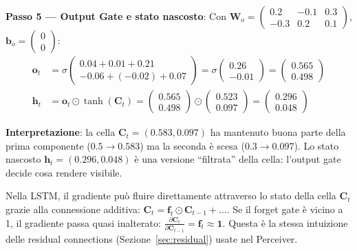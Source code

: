 \documentclass[12pt,a4paper]{article}
\begin{document}
\begin{examplebox}
\textbf{Passo 5 --- Output Gate e stato nascosto}:
Con $\mathbf{W}_o = \begin{pmatrix} 0.2 & -0.1 & 0.3 \\ -0.3 & 0.2 & 0.1 \end{pmatrix}$, $\mathbf{b}_o = \begin{pmatrix} 0 \\ 0 \end{pmatrix}$:
\begin{align*}
    \mathbf{o}_t &= \sigma\!\begin{pmatrix} 0.04 + 0.01 + 0.21 \\ -0.06 + (-0.02) + 0.07 \end{pmatrix} = \sigma\!\begin{pmatrix} 0.26 \\ -0.01 \end{pmatrix} = \begin{pmatrix} 0.565 \\ 0.498 \end{pmatrix} \\
    \mathbf{h}_t &= \mathbf{o}_t \odot \tanh(\mathbf{C}_t) = \begin{pmatrix} 0.565 \\ 0.498 \end{pmatrix} \odot \begin{pmatrix} 0.523 \\ 0.097 \end{pmatrix} = \begin{pmatrix} 0.296 \\ 0.048 \end{pmatrix}
\end{align*}

\textbf{Interpretazione}: la cella $\mathbf{C}_t = (0.583, 0.097)$ ha mantenuto buona parte della prima componente ($0.5 \to 0.583$) ma la seconda \`e scesa ($0.3 \to 0.097$). Lo stato nascosto $\mathbf{h}_t = (0.296, 0.048)$ \`e una versione ``filtrata'' della cella: l'output gate decide cosa rendere visibile.
\end{examplebox}

\begin{notabox}
Nella LSTM, il gradiente pu\`o fluire direttamente attraverso lo stato della cella $\mathbf{C}_t$ grazie alla connessione additiva: $\mathbf{C}_t = \mathbf{f}_t \odot \mathbf{C}_{t-1} + \ldots$. Se il forget gate \`e vicino a 1, il gradiente passa quasi inalterato: $\frac{\partial \mathbf{C}_t}{\partial \mathbf{C}_{t-1}} = \mathbf{f}_t \approx \mathbf{1}$. Questa \`e la stessa intuizione delle residual connections (Sezione~\ref{sec:residual}) usate nel Perceiver.
\end{notabox}
\end{document}
